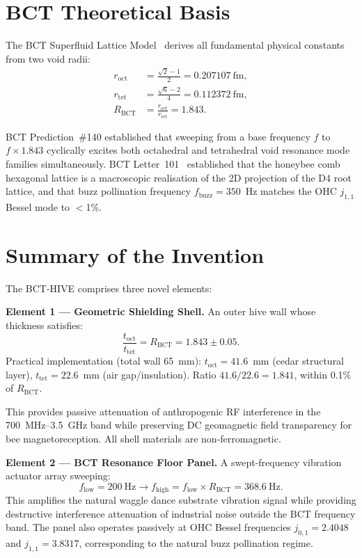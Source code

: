 \documentclass[12pt,twocolumn]{article}
\begin{document}
\section{BCT Theoretical Basis}

The BCT Superfluid Lattice Model~\cite{BCT_L101} derives all
fundamental physical constants from two void radii:
\begin{align}
r_\mathrm{oct} &= \frac{\sqrt{2}-1}{2} = 0.207107~\mathrm{fm},\\
r_\mathrm{tet} &= \frac{\sqrt{6}-2}{4} = 0.112372~\mathrm{fm},\\
R_\mathrm{BCT} &= \frac{r_\mathrm{oct}}{r_\mathrm{tet}} = 1.843.
\end{align}

BCT Prediction~\#140 established that sweeping from a base
frequency $f$ to $f\times1.843$ cyclically excites both octahedral
and tetrahedral void resonance mode families simultaneously. BCT
Letter~101~\cite{BCT_L101} established that the honeybee comb
hexagonal lattice is a macroscopic realisation of the 2D projection
of the D4 root lattice, and that buzz pollination frequency
$f_\mathrm{buzz}=350$~Hz matches the OHC $j_{1,1}$ Bessel mode
to $<$1\%.

\section{Summary of the Invention}

The BCT-HIVE comprises three novel elements:

\textbf{Element 1 --- Geometric Shielding Shell.}
An outer hive wall whose thickness satisfies:
\begin{equation}
\frac{t_\mathrm{oct}}{t_\mathrm{tet}} = R_\mathrm{BCT} = 1.843\pm0.05.
\end{equation}
Practical implementation (total wall 65~mm): $t_\mathrm{oct}=41.6$~mm
(cedar structural layer), $t_\mathrm{tet}=22.6$~mm (air gap/insulation).
Ratio $41.6/22.6=1.841$, within 0.1\% of $R_\mathrm{BCT}$.

This provides passive attenuation of anthropogenic RF interference
in the 700~MHz--3.5~GHz band while preserving DC geomagnetic field
transparency for bee magnetoreception. All shell materials are
non-ferromagnetic.

\textbf{Element 2 --- BCT Resonance Floor Panel.}
A swept-frequency vibration actuator array sweeping:
\begin{equation}
f_\mathrm{low} = 200~\mathrm{Hz} \longrightarrow
f_\mathrm{high} = f_\mathrm{low}\times R_\mathrm{BCT}
= 368.6~\mathrm{Hz}.
\end{equation}
This amplifies the natural waggle dance substrate vibration signal
while providing destructive interference attenuation of industrial
noise outside the BCT frequency band. The panel also operates
passively at OHC Bessel frequencies $j_{0,1}=2.4048$ and
$j_{1,1}=3.8317$, corresponding to the natural buzz pollination
regime.
\end{document}
